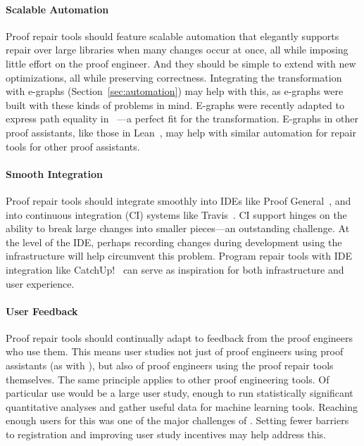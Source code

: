 \paragraph{Scalable Automation}
Proof repair tools should feature scalable automation that elegantly supports repair over large libraries when many changes occur at once,
all while imposing little effort on the proof engineer.
And they should be simple to extend with new optimizations, all while preserving correctness.
Integrating the \toolnamec transformation with e-graphs (Section~\ref{sec:automation}) may help with this,
as e-graphs were built with these kinds of problems in mind.
E-graphs were recently adapted to express path equality in ~\cite{egraph6}---a perfect fit for the \toolnamec transformation.
E-graphs in other proof assistants, like those in Lean~\cite{selsam:lean}, may help with similar automation for repair tools for other proof assistants.

\paragraph{Smooth Integration}
Proof repair tools should integrate smoothly into IDEs like Proof General~\cite{proofgeneral},
and into continuous integration (CI) systems like Travis~\cite{travis}.
CI support hinges on the ability to break large changes into smaller pieces---an outstanding challenge.
At the level of the IDE, perhaps recording changes during development using the infrastructure
 will help circumvent this problem.
Program repair tools with IDE integration like CatchUp!~\cite{Henkel:2005:CCR:1062455.1062512} can
serve as inspiration for both infrastructure and user experience.

\paragraph{User Feedback} 
Proof repair tools should continually adapt to feedback from the proof engineers who use them.
This means user studies not just of proof engineers using proof assistants (as with ),
but also of proof engineers using the proof repair tools themselves.
The same principle applies to other proof engineering tools.
Of particular use would be a large user study, enough to run statistically significant quantitative analyses
and gather useful data for machine learning tools.
Reaching enough users for this was one of the major challenges of .
Setting fewer barriers to registration and improving user study incentives may help address this.

